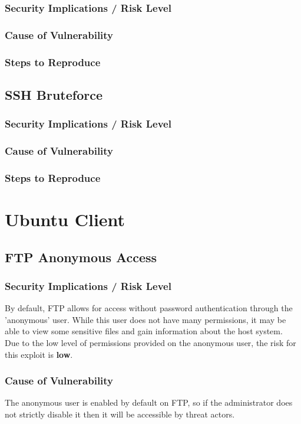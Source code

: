 \documentclass{report}
\begin{document}
\subsubsection{Security Implications / Risk Level}
\subsubsection{Cause of Vulnerability}
\subsubsection{Steps to Reproduce}

\subsection{SSH Bruteforce}
\subsubsection{Security Implications / Risk Level}
\subsubsection{Cause of Vulnerability}
\subsubsection{Steps to Reproduce}



\section{Ubuntu Client}
\subsection{FTP Anonymous Access}
\subsubsection{Security Implications / Risk Level}
By default, FTP allows for access without password authentication through the 'anonymous' user. While this user does not have many permissions, it may be able to view some sensitive files and gain information about the host system.\\
Due to the low level of permissions provided on the anonymous user, the risk for this exploit is \textbf{low}.
\subsubsection{Cause of Vulnerability}
The anonymous user is enabled by default on FTP, so if the administrator does not strictly disable it then it will be accessible by threat actors.
\end{document}
